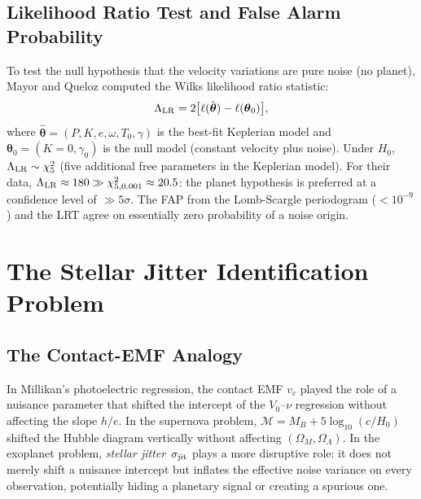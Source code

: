 \documentclass[12pt]{article}
\begin{document}
\subsection{Likelihood Ratio Test and False Alarm Probability}

To test the null hypothesis that the velocity variations are pure
noise (no planet), Mayor and Queloz computed the Wilks
\citeyearpar{Wilks1938} likelihood ratio statistic:
\begin{equation}\label{eq:lrt}
  \Lambda_{\rm LR} = 2\bigl[\ell(\hat{\boldsymbol\theta})
  - \ell(\boldsymbol\theta_0)\bigr],
\end{equation}
where $\hat{\boldsymbol\theta} = (P, K, e, \omega, T_0, \gamma)$ is the
best-fit Keplerian model and $\boldsymbol\theta_0 = (K=0, \gamma_0)$
is the null model (constant velocity plus noise).  Under $H_0$,
$\Lambda_{\rm LR} \sim \chi^2_5$ (five additional free parameters in
the Keplerian model).  For their data,
$\Lambda_{\rm LR} \approx 180 \gg \chi^2_{5,0.001} \approx 20.5$:
the planet hypothesis is preferred at a confidence level of
$\gg 5\sigma$.  The FAP from the Lomb-Scargle periodogram
($< 10^{-9}$) and the LRT agree on essentially zero probability of a
noise origin.

\section{The Stellar Jitter Identification Problem}
\label{sec:nuisance}

\subsection{The Contact-EMF Analogy}

In Millikan's photoelectric regression, the contact EMF $v_c$ played
the role of a nuisance parameter that shifted the intercept of the
$V_0$--$\nu$ regression without affecting the slope $h/e$.  In the
supernova problem, $\mathcal{M} = M_B + 5\log_{10}(c/H_0)$ shifted the
Hubble diagram vertically without affecting $(\Omega_M, \Omega_\Lambda)$.
In the exoplanet problem, \emph{stellar jitter}~$\sigma_{\rm jit}$
plays a more disruptive role: it does not merely shift a nuisance
intercept but inflates the effective noise variance on every observation,
potentially hiding a planetary signal or creating a spurious one.
\end{document}
